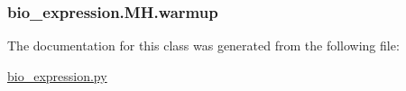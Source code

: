 \hypertarget{classbio__expression_1_1_m_h_a56901e6f39d9fc5a25b97c2f8c5f4e23}{
\subsubsection[{warmup}]{\setlength{\rightskip}{0pt plus 5cm}bio\+\_\+expression.\+M\+H.\+warmup}}\label{classbio__expression_1_1_m_h_a56901e6f39d9fc5a25b97c2f8c5f4e23}


The documentation for this class was generated from the following file\+:\begin{DoxyCompactItemize}
\item 
\hyperlink{bio__expression_8py}{bio\+\_\+expression.\+py}\end{DoxyCompactItemize}
